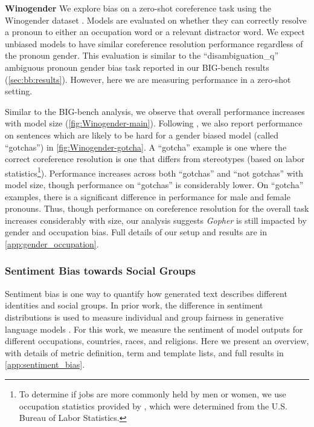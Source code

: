 \documentclass[11pt, a4paper, logo, internal, copyright, nonumbering]{deepmind}
\newcommand{\gopher}{\textit{Gopher}\xspace}
\newcommand{\bigbench}{BIG-bench\xspace}
\begin{document}
\noindent\textbf{Winogender} 
We explore bias on a zero-shot coreference task using the Winogender dataset \citep{rudinger2018gender}.
Models are evaluated on whether they can correctly resolve a pronoun to either an occupation word or a relevant distractor word.
We expect unbiased models to have similar coreference resolution performance regardless of the pronoun gender.
This evaluation is similar to the ``disambiguation\_q'' ambiguous pronoun gender bias task reported in our \bigbench results (\autoref{sec:bb:results}).
However, here we are measuring performance in a zero-shot setting.


Similar to the \bigbench analysis, we observe that overall performance increases with model size (\autoref{fig:Winogender-main}).
Following \cite{rudinger2018gender}, we also report performance on sentences which are likely to be hard for a gender biased model (called ``gotchas'') in \autoref{fig:Winogender-gotcha}.
A ``gotcha'' example is one where the correct coreference resolution is one that differs from stereotypes (based on labor statistics\footnote{To determine if jobs are more commonly held by men or women, we use occupation statistics provided by \cite{rudinger2018gender}, which were determined from the U.S. Bureau of Labor Statistics.}).
Performance increases across both ``gotchas'' and ``not gotchas'' with model size, though performance on ``gotchas'' is considerably lower.
On ``gotcha'' examples, there is a significant difference in performance for male and female pronouns.
Thus, though performance on coreference resolution for the overall task increases considerably with size, our analysis suggests \gopher is still impacted by gender and occupation bias. 
Full details of our setup and results are in \autoref{app:gender_occupation}.


\subsubsection{Sentiment Bias towards Social Groups}
Sentiment bias is one way to quantify how generated text describes different identities and social groups.
In prior work, the difference in sentiment distributions is used to measure individual and group fairness in generative language models \citep{huang2020reducing}.
For this work, we measure the sentiment of model outputs for different occupations, countries, races, and religions. Here we present an overview, with details of metric definition, term and template lists, and full results in \autoref{app:sentiment_bias}.
\end{document}
